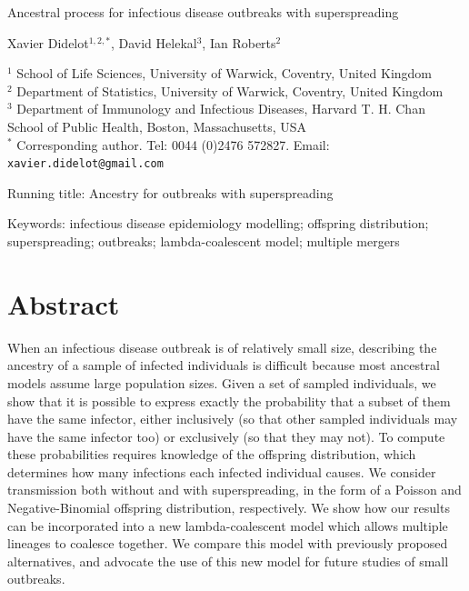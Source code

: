 \documentclass{article}
\begin{document}
{\Large Ancestral process for infectious disease outbreaks with superspreading}


\vspace*{2cm}
Xavier Didelot$^{1,2,*}$, David Helekal$^{3}$, Ian Roberts$^{2}$

\vspace*{2cm}
$^1$ School of Life Sciences, University of Warwick, Coventry, United Kingdom\\
$^2$ Department of Statistics, University of Warwick, Coventry, United Kingdom\\
$^3$ Department of Immunology and Infectious Diseases, Harvard T. H. Chan School of Public Health, Boston, Massachusetts, USA\\
$^*$ Corresponding author. Tel: 0044 (0)2476 572827. Email: \verb+xavier.didelot@gmail.com+

\vspace*{2cm}
Running title: Ancestry for outbreaks with superspreading

\vspace*{2cm}
Keywords: infectious disease epidemiology modelling; offspring distribution; superspreading; outbreaks; lambda-coalescent model; multiple mergers

\newpage
\section*{Abstract}

When an infectious disease outbreak is of relatively small size, describing the ancestry
of a sample of infected individuals is difficult because most ancestral models assume
large population sizes. Given a set of sampled individuals, 
we show that it is possible to express exactly
the probability that a subset of them have the same infector, either inclusively
(so that other sampled individuals may have the same infector too) or exclusively 
(so that they may not).
To compute these probabilities requires knowledge of the offspring distribution, 
which determines how many infections each infected individual causes. 
We consider transmission both without and with superspreading, in the form of a 
Poisson and Negative-Binomial offspring distribution, respectively. 
We show how our results can be incorporated into a new lambda-coalescent model
which allows multiple lineages to coalesce together. We compare this model
with previously proposed alternatives, and advocate the use of this new model
for future studies of small outbreaks.
\end{document}
